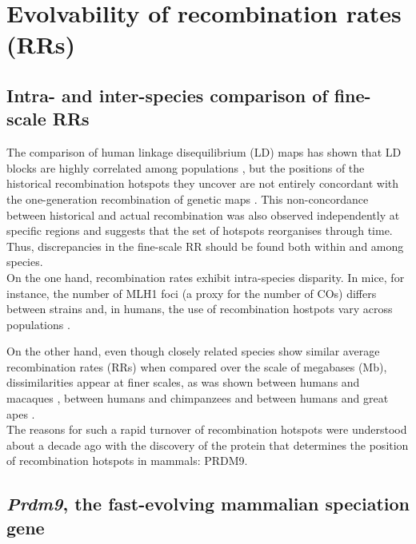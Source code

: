 \section{Evolvability of recombination rates (RRs)}

\subsection{Intra- and inter-species comparison of fine-scale RRs}

The comparison of human linkage disequilibrium (LD) maps has shown that LD blocks are highly correlated among populations \citep{gabriel2002structure}, but the positions of the historical recombination hotspots they uncover are not entirely concordant with the one-generation recombination of genetic maps \citep{tapper2005map}. 
This non-concordance between historical and actual recombination was also observed independently at specific regions \citep{jeffreys2005human,kauppi2005localized} and suggests that the set of hotspots reorganises through time.
Thus, discrepancies in the fine-scale RR should be found both within and among species.\\

On the one hand, recombination rates exhibit intra-species disparity.
In mice, for instance, the number of MLH1 foci (a proxy for the number of COs) differs between strains \citep{koehler2002genetic,paigen2008recombinational,baier2014variation} and, in humans, the use of recombination hostpots vary across populations \citep{berg2011variants,hinch2011landscape}.

On the other hand, even though closely related species show similar average recombination rates (RRs) \citep{dumont2008evolution,hassold2009cytological,garcia-cruz2011comparative,auton2012finescale} when compared over the scale of megabases (Mb), dissimilarities appear at finer scales, as was shown between humans and macaques \citep{wall2003comparative}, between humans and chimpanzees \citep{ptak2004absence,ptak2005finescale,winckler2005comparison} and between humans and great apes \citep{stevison2016time}.\\

The reasons for such a rapid turnover of recombination hotspots were understood about a decade ago with the discovery of the protein that determines the position of recombination hotspots in mammals: PRDM9.


\subsection{\textit{Prdm9}, the fast-evolving mammalian speciation gene}

